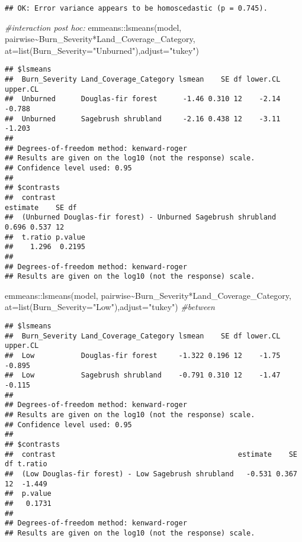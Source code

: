 \documentclass[
]{article}
\newenvironment{Shaded}{\begin{snugshade}}{\end{snugshade}}
\newcommand{\AttributeTok}[1]{\textcolor[rgb]{0.77,0.63,0.00}{#1}}
\newcommand{\CommentTok}[1]{\textcolor[rgb]{0.56,0.35,0.01}{\textit{#1}}}
\newcommand{\FunctionTok}[1]{\textcolor[rgb]{0.00,0.00,0.00}{#1}}
\newcommand{\NormalTok}[1]{#1}
\newcommand{\SpecialCharTok}[1]{\textcolor[rgb]{0.00,0.00,0.00}{#1}}
\newcommand{\StringTok}[1]{\textcolor[rgb]{0.31,0.60,0.02}{#1}}
\begin{document}
\begin{verbatim}
## OK: Error variance appears to be homoscedastic (p = 0.745).
\end{verbatim}

\begin{Shaded}
\begin{Highlighting}[]
\CommentTok{\#interaction post hoc: }
\NormalTok{emmeans}\SpecialCharTok{::}\FunctionTok{lsmeans}\NormalTok{(model, pairwise}\SpecialCharTok{\textasciitilde{}}\NormalTok{Burn\_Severity}\SpecialCharTok{*}\NormalTok{Land\_Coverage\_Category, }\AttributeTok{at=}\FunctionTok{list}\NormalTok{(}\AttributeTok{Burn\_Severity=}\StringTok{"Unburned"}\NormalTok{),}\AttributeTok{adjust=}\StringTok{"tukey"}\NormalTok{) }
\end{Highlighting}
\end{Shaded}

\begin{verbatim}
## $lsmeans
##  Burn_Severity Land_Coverage_Category lsmean    SE df lower.CL upper.CL
##  Unburned      Douglas-fir forest      -1.46 0.310 12    -2.14   -0.788
##  Unburned      Sagebrush shrubland     -2.16 0.438 12    -3.11   -1.203
## 
## Degrees-of-freedom method: kenward-roger 
## Results are given on the log10 (not the response) scale. 
## Confidence level used: 0.95 
## 
## $contrasts
##  contrast                                                     estimate    SE df
##  (Unburned Douglas-fir forest) - Unburned Sagebrush shrubland    0.696 0.537 12
##  t.ratio p.value
##    1.296  0.2195
## 
## Degrees-of-freedom method: kenward-roger 
## Results are given on the log10 (not the response) scale.
\end{verbatim}

\begin{Shaded}
\begin{Highlighting}[]
\NormalTok{emmeans}\SpecialCharTok{::}\FunctionTok{lsmeans}\NormalTok{(model, pairwise}\SpecialCharTok{\textasciitilde{}}\NormalTok{Burn\_Severity}\SpecialCharTok{*}\NormalTok{Land\_Coverage\_Category, }\AttributeTok{at=}\FunctionTok{list}\NormalTok{(}\AttributeTok{Burn\_Severity=}\StringTok{"Low"}\NormalTok{),}\AttributeTok{adjust=}\StringTok{"tukey"}\NormalTok{) }\CommentTok{\#between }
\end{Highlighting}
\end{Shaded}

\begin{verbatim}
## $lsmeans
##  Burn_Severity Land_Coverage_Category lsmean    SE df lower.CL upper.CL
##  Low           Douglas-fir forest     -1.322 0.196 12    -1.75   -0.895
##  Low           Sagebrush shrubland    -0.791 0.310 12    -1.47   -0.115
## 
## Degrees-of-freedom method: kenward-roger 
## Results are given on the log10 (not the response) scale. 
## Confidence level used: 0.95 
## 
## $contrasts
##  contrast                                           estimate    SE df t.ratio
##  (Low Douglas-fir forest) - Low Sagebrush shrubland   -0.531 0.367 12  -1.449
##  p.value
##   0.1731
## 
## Degrees-of-freedom method: kenward-roger 
## Results are given on the log10 (not the response) scale.
\end{verbatim}
\end{document}

